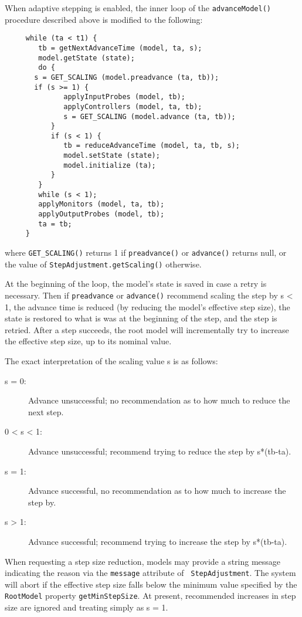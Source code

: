 \documentclass{article}
\begin{document}
When adaptive stepping is enabled, the inner loop of the
{\tt advanceModel()} procedure described above is modified to the following:
\begin{lstlisting}
     while (ta < t1) {
        tb = getNextAdvanceTime (model, ta, s);
        model.getState (state);
        do {
	   s = GET_SCALING (model.preadvance (ta, tb));
	   if (s >= 1) {
              applyInputProbes (model, tb);
              applyControllers (model, ta, tb);
              s = GET_SCALING (model.advance (ta, tb));
           }
           if (s < 1) {
              tb = reduceAdvanceTime (model, ta, tb, s);
              model.setState (state);
              model.initialize (ta);
           }
        }
        while (s < 1);
        applyMonitors (model, ta, tb);
        applyOutputProbes (model, tb);
        ta = tb;
     }
\end{lstlisting}
where {\tt GET\_SCALING()} returns 1 if {\tt preadvance()} or
{\tt advance()} returns null, or the value of 
{\tt StepAdjustment.getScaling()} otherwise.

At the beginning of the loop, the model's state is saved in case a
retry is necessary. Then if {\tt preadvance{}} or {\tt advance()} recommend
scaling the step by s < 1, the advance time is
reduced (by reducing the model's effective step size), the state is
restored to what is was at the beginning of the step, and the step is
retried. After a step succeeds, the root model will
incrementally try to increase the effective step size, up to its
nominal value.

The exact interpretation of the scaling value s is
as follows:

\begin{description}
\item[s = 0:]
Advance unsuccessful; no recommendation as to how much to reduce the 
next step.

\item[0 < s < 1:]
Advance unsuccessful; recommend trying to reduce the step by s*(tb-ta).

\item[s = 1:]
Advance successful, no recommendation as to how much to increase the step by.

\item[s > 1:]
Advance successful; recommend trying to increase the step by s*(tb-ta).
\end{description}

When requesting a step size reduction, models may provide a string
message indicating the reason via the {\tt message} attribute of {\tt
StepAdjustment}.  The system will abort if the effective step size
falls below the minimum value specified by the {\tt RootModel}
property {\tt getMinStepSize}. At present, recommended increases in
step size are ignored and treating simply as s = 1.
\end{document}
